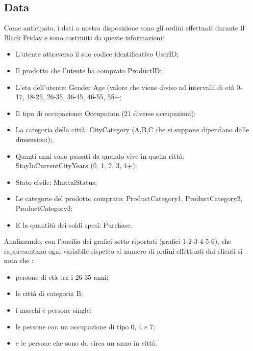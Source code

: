 \documentclass{article}
\begin{document}
\subsection{Data}
Come anticipato, i dati a nostra disposizione sono gli ordini effettuati durante il Black Friday e sono costituiti da queste informazioni:
\begin{itemize}
\item L'utente attraverso il suo codice identificativo UserID;
\item Il prodotto che l'utente ha comprato ProductID;
\item L'eta dell'utente: Gender Age (valore che viene diviso ad intervalli di età 0-17, 18-25, 26-35, 36-45, 46-55, 55+;
\item Il tipo di occupazione: Occupation (21 diverse occupazioni);
\item La categoria della città:  CityCategory (A,B,C che si suppone dipendano dalle dimensioni);
\item Quanti anni sono passati da quando vive in quella città: StayInCurrentCityYears (0, 1, 2, 3, 4+);
\item Stato civile: MaritalStatus;
\item Le categorie del prodotto comprato: ProductCategory1, ProductCategory2, ProductCategory3;
\item E la quantità dei soldi spesi: Purchase.
\end{itemize}

Analizzando, con l'ausilio dei grafici sotto riportati (grafici 1-2-3-4-5-6), che rappresentano ogni variabile rispetto al numero di ordini effettuati dai clienti si nota che :

\begin{itemize}
\item persone di età tra i 26-35 anni;
\item le città di categoria B;
\item i maschi e persone single;
\item le persone con un occupazione di tipo 0, 4 e 7;
\item e le persone che sono da circa un anno in città.
\end{itemize}
\end{document}
